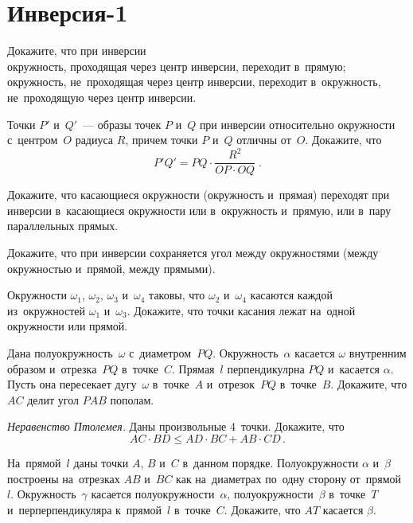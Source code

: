 
\section*{Инверсия-1}


\begin{problems}

\item
Докажите, что при инверсии
\\
\subproblem
окружность, проходящая через центр инверсии, переходит в~прямую;
\\
\subproblem
окружность, не~проходящая через центр инверсии, переходит в~окружность,
не~проходящую через центр инверсии.

\item
Точки $P'$ и~$Q'$~--- образы точек $P$ и~$Q$ при инверсии относительно
окружности с~центром~$O$ радиуса $R$, причем точки $P$ и~$Q$ отличны от~$O$.
Докажите, что
\[
    P'Q' = PQ \cdot \frac{R^2}{OP \cdot OQ}
\; . \]

\item
Докажите, что касающиеся окружности (окружность и~прямая) переходят при
инверсии в~касающиеся окружности или в~окружность и~прямую, или в~пару
параллельных прямых.

\item
Докажите, что при инверсии сохраняется угол между окружностями (между
окружностью и~прямой, между прямыми).

\item
Окружности $\omega_1$, $\omega_2$, $\omega_3$ и~$\omega_4$ таковы, что
$\omega_2$ и~$\omega_4$ касаются каждой из~окружностей $\omega_1$ и~$\omega_3$.
Докажите, что точки касания лежат на~одной окружности или прямой.

\item
Дана полуокружность~$\omega$ с~диаметром~$PQ$.
Окружность~$\alpha$ касается $\omega$ внутренним образом и~отрезка~$PQ$
в~точке~$C$.
Прямая~$l$ перпендикулрна $PQ$ и~касается $\alpha$.
Пусть она пересекает дугу~$\omega$ в~точке~$A$ и~отрезок~$PQ$ в~точке~$B$.
Докажите, что $AC$ делит угол $PAB$ пополам.

\item \emph{Неравенство Птолемея.}\enspace
Даны произвольные 4~точки.
Докажите, что
\[
    AC \cdot BD
\leq
    AD \cdot BC + AB \cdot CD
\, . \]

\item
На~прямой~$l$ даны точки $A$, $B$ и~$C$ в~данном порядке.
Полуокружности $\alpha$ и~$\beta$ построены на~отрезках $AB$ и~$BC$ как
на~диаметрах по~одну сторону от~прямой~$l$.
Окружность~$\gamma$ касается полуокружности~$\alpha$, полуокружности~$\beta$
в~точке~$T$ и~перперпендикуляра к~прямой~$l$ в~точке~$C$.
Докажите, что $AT$ касается $\beta$.


\end{problems}
